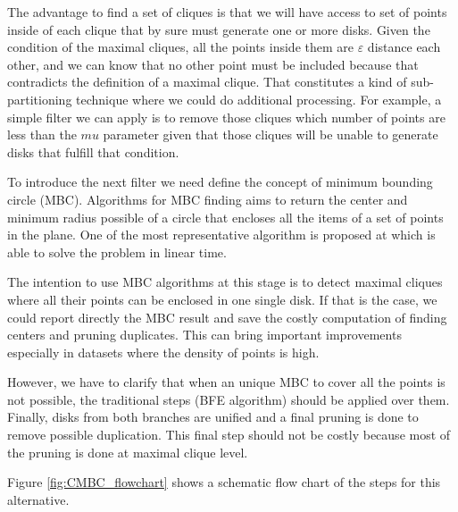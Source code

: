 \begin{itemize}
The advantage to find a set of cliques is that we will have access to set of points inside of each clique that by sure must generate one or more disks.  Given the condition of the maximal cliques, all the points inside them are $\varepsilon$ distance each other, and we can know that no other point must be included because that contradicts the definition of a maximal clique.  That constitutes a kind of sub-partitioning technique where we could do additional processing. For example, a simple filter we can apply is to remove those cliques which number of points are less than the $mu$ parameter given that those cliques will be unable to generate disks that fulfill that condition.

To introduce the next filter we need define the concept of minimum bounding circle (MBC).  Algorithms for MBC finding aims to return the center and minimum radius possible of a circle that encloses all the items of a set of points in the plane.  One of the most representative algorithm is proposed at \cite{welzl_mbc_1991} which is able to solve the problem in linear time.

The intention to use MBC algorithms at this stage is to detect maximal cliques where all their points can be enclosed in one single disk.  If that is the case, we could report directly the MBC result and save the costly computation of finding centers and pruning duplicates.  This can bring important improvements especially in datasets where the density of points is high. 

However, we have to clarify that when an unique MBC to cover all the points is not possible, the traditional steps (BFE algorithm) should be applied over them.  Finally, disks from both branches are unified and a final pruning is done to remove possible duplication.  This final step should not be costly because most of the pruning is done at maximal clique level.

Figure \ref{fig:CMBC_flowchart} shows a schematic flow chart of the steps for this alternative.


\end{itemize}
